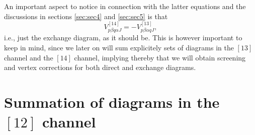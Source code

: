 An important aspect to notice in connection with the latter
equations and the discussions in  sections \ref{sec:sec4}
and \ref{sec:sec5} is that 
\begin{equation} 
    V_{p\beta q\alpha J}^{[14]}=-V_{p\beta \alpha q J}^{[13]},
\end{equation}
i.e., just the exchange diagram, as it should be.
This is however important to keep in mind, since we later
on will sum explicitely sets of diagrams in the
$[13]$ channel and the $[14]$ channel, implying thereby that
we will obtain screening and vertex corrections
for  both direct and exchange  diagrams. 

\section{Summation of diagrams in the $[12]$ channel}
\label{sec:sec3}


